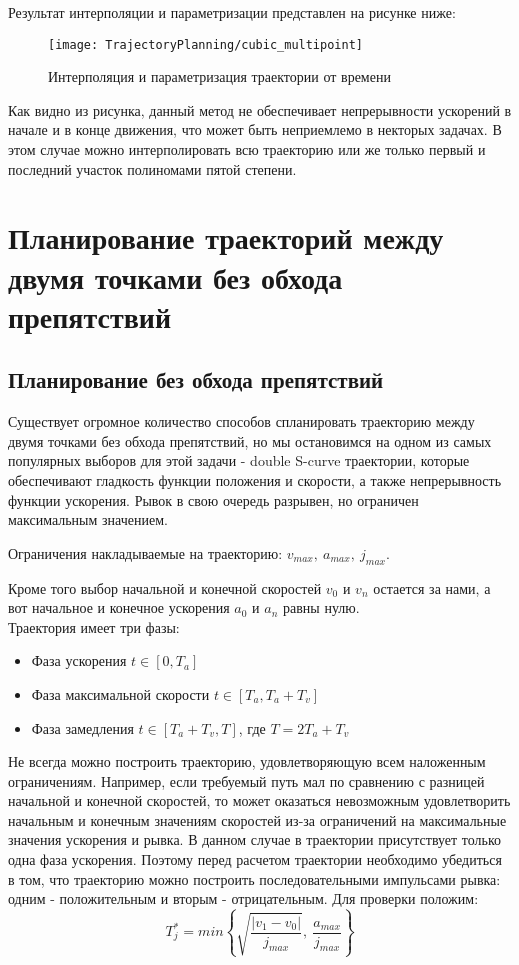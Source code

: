Результат интерполяции и параметризации представлен на рисунке ниже:
\begin{figure}[ht]
	\centering
	\texttt{[image: TrajectoryPlanning/cubic\_multipoint]}
	\caption{Интерполяция и параметризация траектории от времени}
\end{figure}

Как видно из рисунка, данный метод не обеспечивает непрерывности ускорений в начале и в конце движения, что может быть неприемлемо в некторых задачах. В этом случае можно интерполировать всю траекторию или же только первый и последний участок полиномами пятой степени.


\section{Планирование траекторий между двумя точками без обхода препятствий} \label{sect5_3}

\subsection{Планирование без обхода препятствий} \label{subsect5_3_1}
	Существует огромное количество способов спланировать траекторию между двумя точками без обхода препятствий, но мы остановимся на одном из самых популярных выборов для этой задачи - double S-curve траектории, которые обеспечивают гладкость функции положения и скорости, а также непрерывность функции ускорения. Рывок в свою очередь разрывен, но ограничен максимальным значением.

	Ограничения накладываемые на траекторию: $v_{max},\ a_{max},\ j_{max}$.
	
	Кроме того выбор начальной и конечной скоростей $v_{0}$ и $v_{n}$ остается за нами, а вот начальное и конечное ускорения $a_{0}$ и $a_{n}$ равны нулю.\\
	
	Траектория имеет три фазы:
	\begin{itemize}
		\item Фаза ускорения $t \in [0,T_{a}]$
		\item Фаза максимальной скорости $t \in [T_{a}, T_{a} + T_{v}]$
		\item Фаза замедления $t \in [T_{a} + T_{v}, T]$, где $T = 2T_{a} + T_{v}$
	\end{itemize}

	Не всегда можно построить траекторию, удовлетворяющую всем наложенным ограничениям. Например, если требуемый путь мал по сравнению с разницей начальной и конечной скоростей, то может оказаться невозможным удовлетворить начальным и конечным значениям скоростей из-за ограничений на максимальные значения ускорения и рывка. В данном случае в траектории присутствует только одна фаза ускорения. Поэтому перед расчетом траектории необходимо убедиться в том, что траекторию можно построить последовательными импульсами рывка: одним - положительным и вторым - отрицательным. Для проверки положим:
	\[
	T_{j}^{*} = min \left\{ \sqrt{\frac{|v_{1} - v_{0}|}{j_{max}}},\ \frac{a_{max}}{j_{max}} \right\}
	\]
	
